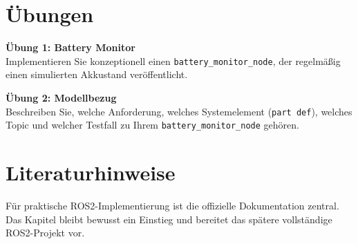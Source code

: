 \section{Übungen}
\begin{uebungbox}
\textbf{Übung 1: Battery Monitor}\\
Implementieren Sie konzeptionell einen \texttt{battery\_monitor\_node}, der regelmäßig einen simulierten Akkustand veröffentlicht.
\end{uebungbox}

\begin{uebungbox}
\textbf{Übung 2: Modellbezug}\\
Beschreiben Sie, welche Anforderung, welches Systemelement (\texttt{part def}), welches Topic und welcher Testfall zu Ihrem \texttt{battery\_monitor\_node} gehören.
\end{uebungbox}

\section{Literaturhinweise}
Für praktische ROS2-Implementierung ist die offizielle Dokumentation \cite{ros2docs} zentral. Das Kapitel bleibt bewusst ein Einstieg und bereitet das spätere vollständige ROS2-Projekt vor.

